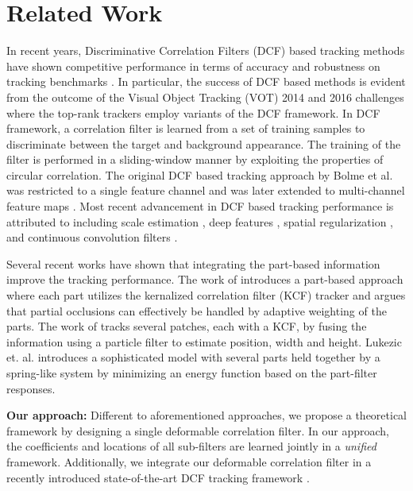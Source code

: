 \documentclass[runningheads,a4paper]{llncs}
\begin{document}
\section{Related Work}
In recent years, Discriminative Correlation Filters (DCF) based tracking methods have shown competitive performance in terms of accuracy and robustness on tracking  benchmarks \cite{VOT2016}\cite{OTB2015}. In particular, the success of DCF based methods is evident from the outcome of the Visual Object Tracking (VOT) 2014 and 2016 challenges \cite{VOT2016} where the top-rank trackers employ variants of the DCF framework. In DCF framework, a correlation filter is learned from a set of training samples to discriminate between the target and background appearance. The training of the filter is performed in a sliding-window manner by exploiting the properties of circular correlation. The original DCF based tracking approach by Bolme et al. \cite{MOSSE2010} was restricted to a single feature channel and was later extended to multi-channel feature maps \cite{galoogahiICCV13}\cite{DanelljanCVPR14}\cite{Henriques14}. Most recent  advancement in DCF based tracking  performance is attributed to including scale estimation \cite{DanelljanBMVC14}\cite{Li2014}, deep features \cite{DanelljanVOT2015}\cite{HCF_ICCV15}, spatial regularization \cite{DanelljanICCV2015}, and continuous convolution filters \cite{DanelljanECCV2016}.

Several recent works have shown that integrating the part-based information improve the tracking performance. The work of \cite{liu2015real} introduces a part-based approach where each part utilizes the kernalized correlation filter (KCF) tracker and argues that partial occlusions can effectively be handled by adaptive weighting of the parts. The work of \cite{li2015reliable} tracks several patches, each with a KCF, by fusing the information using a particle filter to estimate position, width and height. Lukezic et. al. \cite{lukevzivc2016deformable} introduces a sophisticated model with several parts held together by a spring-like system by minimizing an energy function based on the part-filter responses.

\noindent\textbf{Our approach:} Different to aforementioned approaches, we propose a theoretical framework by designing a single deformable correlation filter. In our approach, the coefficients and locations of all sub-filters are learned jointly in a \emph{unified} framework. Additionally, we integrate our deformable correlation filter in a recently introduced state-of-the-art DCF tracking framework \cite{DanelljanECCV2016}.
\end{document}
